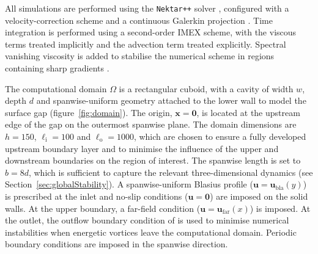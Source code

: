\documentclass[lineno]{jfm}
\begin{document}
All simulations are performed using the \texttt{Nektar++} solver \citep{nektar}, configured with a velocity-correction scheme and a continuous Galerkin projection \citep{vcs1,vcs2}. Time integration is performed using a second-order IMEX scheme, with the viscous terms treated implicitly and the advection term treated explicitly. Spectral vanishing viscosity is added to stabilise the numerical scheme in regions containing sharp gradients \citep{svv}.

The computational domain $\Omega$ is a rectangular cuboid, with a cavity of width $w$, depth $d$ and spanwise-uniform geometry attached to the lower wall to model the surface gap (figure~\ref{fig:domain}). The origin, $\boldsymbol{x}=\boldsymbol{0}$, is located at the upstream edge of the gap on the outermost spanwise plane. The domain dimensions are $h=150$, $\ell_{\mathrm{i}}=100$ and $\ell_{\mathrm{o}}=1000$, which are chosen to ensure a fully developed upstream boundary layer and to minimise the influence of the upper and downstream boundaries on the region of interest. The spanwise length is set to $b=8d$, which is sufficient to capture the relevant three-dimensional dynamics (see Section~\ref{sec:globalStability}). A spanwise-uniform Blasius profile ($\boldsymbol{u}=\boldsymbol{u}_\mathrm{bla}(y)$) is prescribed at the inlet and no-slip conditions ($\boldsymbol{u}=\boldsymbol{0}$) are imposed on the solid walls. At the upper boundary, a far-field condition ($\boldsymbol{u}=\boldsymbol{u}_\mathrm{far}(x)$) is imposed. At the outlet, the outflow boundary condition of \citet{dong} is used to minimise numerical instabilities when energetic vortices leave the computational domain. Periodic boundary conditions are imposed in the spanwise direction.
\end{document}

